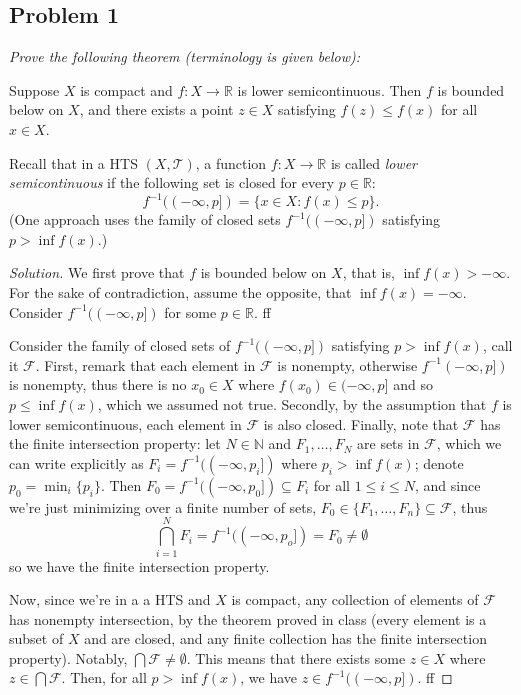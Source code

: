 \documentclass{article}
\newcommand{\N}{{\mathbb N}}
\newcommand{\R}{{\mathbb R}}
\begin{document}
\subsection*{Problem 1}
{\it Prove the following theorem (terminology is given below):
\begin{center}
	Suppose $X$ is compact and $f \colon X \to \R$ is lower semicontinuous.
	Then $f$ is bounded below on $X$,
	and there exists a point $z \in X$ satisfying $f(z) \leq f(x)$ for all $x \in X$.
\end{center}
Recall that in a HTS $(X, \mathcal{T})$, a function $f \colon X \to \R$
is called \emph{lower semicontinuous} if the following set
is closed for every $p \in \R$:
\[
	f^{-1}((-\infty,p]) = \{x \in X \colon f(x) \leq p \}.
\]
(One approach uses the family of closed sets
$f^{-1}((-\infty,p])$ satisfying $p > \inf f(x)$.)}

\begin{proof}[Solution]\let\qed\relax
	We first prove that $f$ is bounded below on $X$,
	that is, $\inf{f(x)} > -\infty$.
	For the sake of contradiction, assume the opposite, that $\inf{f(x)} = -\infty$.
	Consider $f^{-1}((-\infty, p])$ for some $p \in \R$.
	ff

	Consider the family of closed sets of $f^{-1}((-\infty,p])$
	satisfying $p > \inf{f(x)}$, call it $\mathcal{F}$.
	First, remark that each element in $\mathcal{F}$ is nonempty,
	otherwise $f^{-1}(-\infty,p])$ is nonempty,
	thus there is no $x_0 \in X$ where $f(x_0) \in (-\infty,p]$
	and so $p \leq \inf{f(x)}$, which we assumed not true.
	Secondly, by the assumption that $f$ is lower semicontinuous,
	each element in $\mathcal{F}$ is also closed.
	Finally, note that $\mathcal{F}$ has the finite intersection property:
	let $N \in \N$ and $F_1, \dots, F_N$ are sets in $\mathcal{F}$,
	which we can write explicitly as $F_i = f^{-1}((-\infty, p_i])$
	where $p_i > \inf{f(x)}$;
	denote $p_0 = \min_i\{p_i\}$.
	Then $F_0 = f^{-1}((-\infty, p_0]) \subseteq F_i$ for all $1 \leq i \leq N$,
	and since we're just minimizing over a finite number of sets,
	$F_0 \in \{F_1,\dots,F_n\} \subseteq \mathcal{F}$, thus
	\[
		\bigcap_{i=1}^N F_i = f^{-1}((-\infty,p_o]) = F_0 \neq \emptyset
	\]
	so we have the finite intersection property.

	Now, since we're in a a HTS and $X$ is compact,
	any collection of elements of $\mathcal{F}$ has nonempty intersection,
	by the theorem proved in class
	(every element is a subset of $X$ and are closed,
	and any finite collection has the finite intersection property).
	Notably, $\bigcap \mathcal{F} \neq \emptyset$.
	This means that there exists some $z \in X$ where $z \in \bigcap\mathcal{F}$.
	Then, for all $p > \inf{f(x)}$, we have $z \in f^{-1}((-\infty,p])$.
	ff
\end{proof}
\clearpage
~\clearpage
\end{document}
